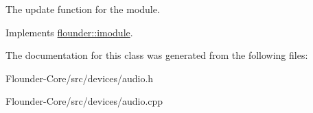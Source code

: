 The update function for the module. 



Implements \hyperlink{classflounder_1_1imodule_a9a53d48a46b5f6b16a92b2cd8503f74a}{flounder\+::imodule}.



The documentation for this class was generated from the following files\+:\begin{DoxyCompactItemize}
\item 
Flounder-\/\+Core/src/devices/audio.\+h\item 
Flounder-\/\+Core/src/devices/audio.\+cpp\end{DoxyCompactItemize}
